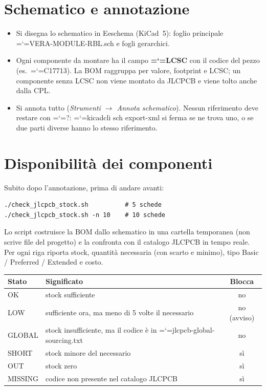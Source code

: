 \documentclass[11pt,a4paper]{article}
\makeatletter
\newcommand{\file}[1]{{\ttfamily\hyphenchar\font=`\-\relax\language=\l@nohyphenation #1}}
\makeatother
\begin{document}
\section{Schematico e annotazione}

\begin{itemize}[leftmargin=*]
  \item Si disegna lo schematico in Eeschema (KiCad~5): foglio principale
        \file{VERA-MODULE-RBL.sch} e fogli gerarchici.
  \item Ogni componente da montare ha il campo \textbf{\file{LCSC}} con il
        codice del pezzo (es.\ \file{C17713}). La BOM raggruppa per valore,
        footprint e LCSC; un componente senza LCSC non viene montato da
        JLCPCB e viene tolto anche dalla CPL.
  \item Si annota tutto (\emph{Strumenti $\rightarrow$ Annota schematico}).
        Nessun riferimento deve restare con \file{?}: \file{kicadcli sch export-xml} si
        ferma se ne trova uno, o se due parti diverse hanno lo stesso
        riferimento.
\end{itemize}

\section{Disponibilità dei componenti}

Subito dopo l'annotazione, prima di andare avanti:

\begin{lstlisting}[style=shell]
./check_jlcpcb_stock.sh          # 5 schede
./check_jlcpcb_stock.sh -n 10    # 10 schede
\end{lstlisting}

Lo script costruisce la BOM dallo schematico in una cartella temporanea (non
scrive file del progetto) e la confronta con il catalogo JLCPCB in tempo reale.
Per ogni riga riporta stock, quantità necessaria (con scarto e minimo), tipo
Basic / Preferred / Extended e costo.

\begin{center}
\begin{tabularx}{\linewidth}{>{\ttfamily}l L c}
\toprule
\normalfont\textbf{Stato} & \textbf{Significato} & \textbf{Blocca} \\
\midrule
OK      & stock sufficiente & no \\
LOW     & sufficiente ora, ma meno di 5 volte il necessario & no (avviso) \\
GLOBAL  & stock insufficiente, ma il codice è in \file{jlcpcb-global-sourcing.txt} & no \\
SHORT   & stock minore del necessario & sì \\
OUT     & stock zero & sì \\
MISSING & codice non presente nel catalogo JLCPCB & sì \\
\bottomrule
\end{tabularx}
\end{center}
\end{document}
